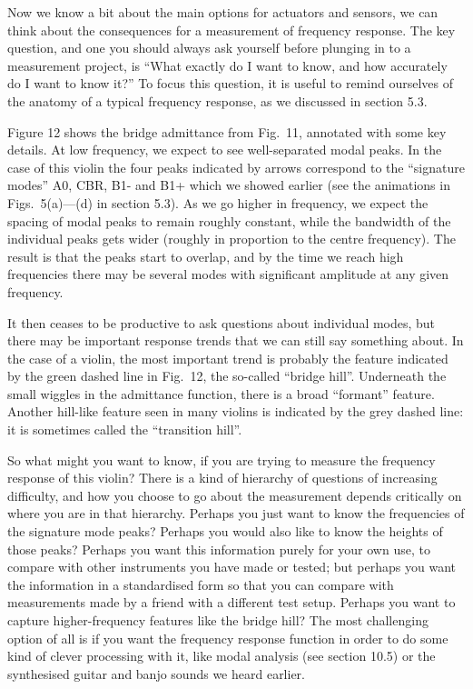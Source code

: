   Now we know a bit about the main options for actuators and sensors, we can 
  think about the consequences for a measurement of frequency response. The key 
  question, and one you should always ask yourself before plunging in to a 
  measurement project, is “What exactly do I want to know, and how accurately 
  do I want to know it?” To focus this question, it is useful to remind 
  ourselves of the anatomy of a typical frequency response, as we discussed in 
  section 5.3. 

  Figure 12 shows the bridge admittance from Fig.\ 11, annotated with some key 
  details. At low frequency, we expect to see well-separated modal peaks. In 
  the case of this violin the four peaks indicated by arrows correspond to the 
  “signature modes” A0, CBR, B1- and B1+ which we showed earlier (see the 
  animations in Figs.\ 5(a)—(d) in section 5.3). As we go higher in frequency, 
  we expect the spacing of modal peaks to remain roughly constant, while the 
  bandwidth of the individual peaks gets wider (roughly in proportion to the 
  centre frequency). The result is that the peaks start to overlap, and by the 
  time we reach high frequencies there may be several modes with significant 
  amplitude at any given frequency. 

  It then ceases to be productive to ask questions about individual modes, but 
  there may be important response trends that we can still say something about. 
  In the case of a violin, the most important trend is probably the feature 
  indicated by the green dashed line in Fig.\ 12, the so-called “bridge hill”. 
  Underneath the small wiggles in the admittance function, there is a broad 
  “formant” feature. Another hill-like feature seen in many violins is 
  indicated by the grey dashed line: it is sometimes called the “transition 
  hill”. 

  So what might you want to know, if you are trying to measure the frequency 
  response of this violin? There is a kind of hierarchy of questions of 
  increasing difficulty, and how you choose to go about the measurement depends 
  critically on where you are in that hierarchy. Perhaps you just want to know 
  the frequencies of the signature mode peaks? Perhaps you would also like to 
  know the heights of those peaks? Perhaps you want this information purely for 
  your own use, to compare with other instruments you have made or tested; but 
  perhaps you want the information in a standardised form so that you can 
  compare with measurements made by a friend with a different test setup. 
  Perhaps you want to capture higher-frequency features like the bridge hill? 
  The most challenging option of all is if you want the frequency response 
  function in order to do some kind of clever processing with it, like modal 
  analysis (see section 10.5) or the synthesised guitar and banjo sounds we 
  heard earlier. 

